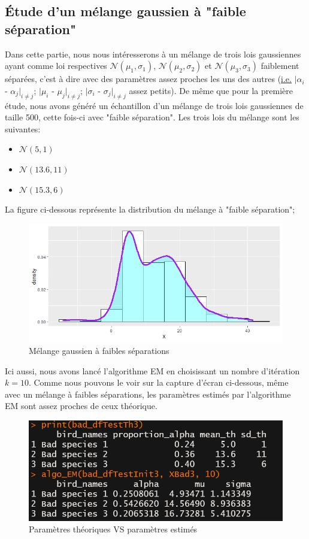 \documentclass[frenchb]{report}
\newcommand{\1}{\mathbbm{1}}
\theoremstyle{definition}\newtheorem{defn}{Définition}
\theoremstyle{definition}\newtheorem{exm}{Exemple}
\theoremstyle{definition}\newtheorem{nota}{Notation}
\theoremstyle{definition}\newtheorem{rem}{Remarque}
\begin{document}
\subsection{Étude d'un mélange gaussien à "faible séparation"}
Dans cette partie, nous nous intéresserons à un mélange de trois lois gaussiennes ayant comme loi respectives $\mathcal{N}(\mu_1, \sigma_1)$, $\mathcal{N}(\mu_2, \sigma_2)$ et $\mathcal{N}(\mu_3, \sigma_3)$ faiblement séparées, c'est à dire avec des paramètres assez proches les uns des autres (\underline{i.e.} $|\alpha_i$ - $\alpha_j|_{i \neq j}$; $|\mu_i$ - $\mu_j|_{i \neq j}$; $|\sigma_i$ - $\sigma_j|_{i \neq j}$ assez petits).
De même que pour la première étude, nous avons généré un échantillon d'un mélange de trois lois gaussiennes de taille 500, cette fois-ci avec "faible séparation". Les trois lois du mélange sont les suivantes:
\begin{itemize}
	\item $\mathcal{N}(5, 1)$
	\item $\mathcal{N}(13.6, 11)$
	\item $\mathcal{N}(15.3, 6)$
\end{itemize}
La figure ci-dessous représente la distribution du mélange à "faible séparation";

\begin{figure}[H]
	\centering
	\includegraphics[scale=0.7]{images/bad_distrib.png}
	\caption{Mélange gaussien à faibles séparations}
\end{figure}
Ici aussi, nous avons lancé l'algorithme EM en choisissant un nombre d'itération $k = 10$. Comme nous pouvons le voir sur la capture d'écran ci-dessous, même avec un mélange à faibles séparations, les paramètres estimés par l'algorithme EM sont assez proches de ceux théorique.
\begin{figure}[H]%
	\centering
	\includegraphics[scale=0.7]{images/EM_bad.png}
	\caption{Paramètres théoriques VS paramètres estimés}
\end{figure}
\end{document}
